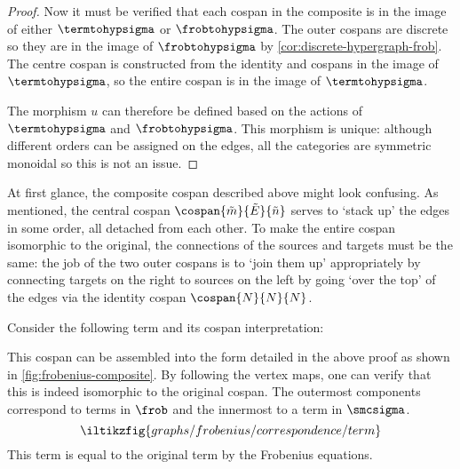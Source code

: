 \begin{proof}
    Now it must be verified that each cospan in the composite is in the image
    of either \(\termtohypsigma\) or \(\frobtohypsigma\).
    The outer cospans are discrete so they are in the image of
    \(\frobtohypsigma\) by \cref{cor:discrete-hypergraph-frob}.
    The centre cospan is constructed from the identity and cospans in the image
    of \(\termtohypsigma\), so the entire cospan is in the
    image of \(\termtohypsigma\).

    The morphism \(u\) can therefore be defined based on the actions of
    \(\termtohypsigma\) and \(\frobtohypsigma\).
    This morphism is unique: although different orders can be assigned on the
    edges, all the categories are symmetric monoidal so this is not an issue.
\end{proof}

At first glance, the composite cospan described above might look confusing.
As mentioned, the central cospan \(\cospan{\tilde{m}}{\tilde{E}}{\tilde{n}}\)
serves to `stack up' the edges in some order, all detached from each other.
To make the entire cospan isomorphic to the original, the connections of the
sources and targets must be the same: the job of the two outer cospans is to
`join them up' appropriately by connecting targets on the right to sources on
the left by going `over the top' of the edges via the identity cospan
\(\cospan{N}{N}{N}\).

\begin{example}\label{ex:frobenius-composite}
    Consider the following term and its cospan interpretation:
    \begin{center}
        \qquad
    \end{center}
    This cospan can be assembled into the form detailed in the above proof as
    shown in \cref{fig:frobenius-composite}.
    By following the vertex maps, one can verify that this is indeed isomorphic
    to the original cospan.
    The outermost components correspond to terms in \(\frob\) and the
    innermost to a term in \(\smcsigma\).
    \[
        \iltikzfig{graphs/frobenius/correspondence/term}
    \]
    This term is equal to the original term by the Frobenius equations.
\end{example}

